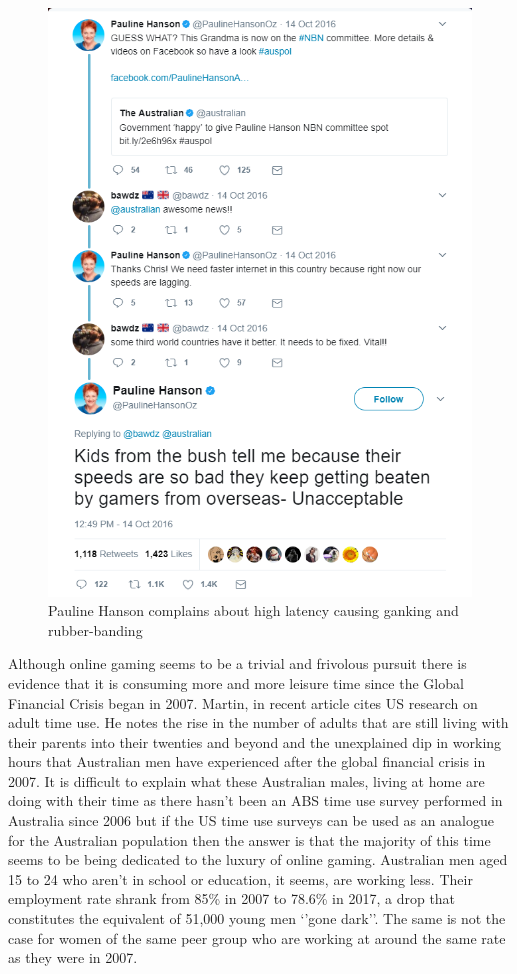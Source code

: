 \begin{figure}[ht]
\centering
\includegraphics[scale=0.5]{figures/PaulineHansonGameSpeed.png}
\caption{Pauline Hanson complains about high latency causing ganking and rubber-banding\cite{RefWorks:307}}
\label{fig:ganking}
\end{figure}

Although online gaming seems to be a trivial and frivolous pursuit there is evidence that it is consuming more and more leisure time since the Global Financial Crisis began in 2007. Martin, in recent article cites US research on adult time use. He notes the rise in the number of adults that are still living with their parents into their twenties and beyond and the unexplained dip in working hours that Australian men have experienced after the global financial crisis in 2007. It is difficult to explain what these Australian males, living at home are doing with their time as there hasn't been an ABS time use survey performed in Australia since 2006 but if the US time use surveys can be used as an analogue for the Australian population then the answer is that the majority of this time seems to be being dedicated to the luxury of online gaming. Australian men aged 15 to 24 who aren't in school or education, it seems, are working less. Their employment rate shrank from 85\% in 2007 to 78.6\% in 2017, a drop that constitutes the equivalent of 51,000 young men `'gone dark''. The same is not the case for women of the same peer group who are working at around the same rate as they were in 2007\cite{RefWorks:335}.

